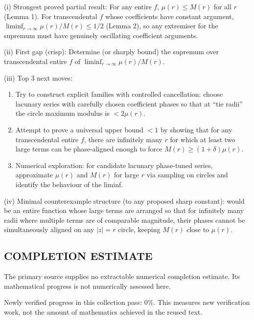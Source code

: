 (i) Strongest proved partial result: For any entire $f$, $\mu(r)\le M(r)$ for all $r$ (Lemma 1). For transcendental $f$ whose coefficients have constant argument, $\liminf_{r\to\infty} \mu(r)/M(r)\le 1/2$ (Lemma 2), so any extremiser for the supremum must have genuinely oscillating coefficient arguments.

(ii) First gap (crisp): Determine (or sharply bound) the supremum over transcendental entire $f$ of $\liminf_{r\to\infty} \mu(r)/M(r)$.

(iii) Top 3 next moves:
\begin{enumerate}
\item Try to construct explicit families with controlled cancellation: choose lacunary series with carefully chosen coefficient phases so that at ``tie radii'' the circle maximum modulus is $<2\mu(r)$.
\item Attempt to prove a universal upper bound $<1$ by showing that for any transcendental entire $f$, there are infinitely many $r$ for which at least two large terms can be phase-aligned enough to force $M(r)\ge (1+\delta)\mu(r)$.
\item Numerical exploration: for candidate lacunary phase-tuned series, approximate $\mu(r)$ and $M(r)$ for large $r$ via sampling on circles and identify the behaviour of the liminf.
\end{enumerate}

(iv) Minimal counterexample structure (to any proposed sharp constant): would be an entire function whose large terms are arranged so that for infinitely many radii where multiple terms are of comparable magnitude, their phases cannot be simultaneously aligned on any $|z|=r$ circle, keeping $M(r)$ close to $\mu(r)$.




\subsection*{COMPLETION ESTIMATE}
The primary source supplies no extractable numerical completion estimate. Its mathematical progress is not numerically assessed here.

Newly verified progress in this collection pass: $0\%$. This measures new verification work, not the amount of mathematics achieved in the reused text.
